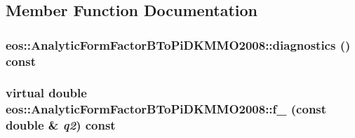 \subsection{Member Function Documentation}
\hypertarget{classeos_1_1AnalyticFormFactorBToPiDKMMO2008_a4996873565e4da45f132cbfdd90f7617}{
\subsubsection[{diagnostics}]{ eos::AnalyticFormFactorBToPiDKMMO2008::diagnostics () const}}
\label{classeos_1_1AnalyticFormFactorBToPiDKMMO2008_a4996873565e4da45f132cbfdd90f7617}
\hypertarget{classeos_1_1AnalyticFormFactorBToPiDKMMO2008_a646f3764614e79700d31571b9df620ba}{
\subsubsection[{f\_\-0}]{\setlength{\rightskip}{0pt plus 5cm}virtual double eos::AnalyticFormFactorBToPiDKMMO2008::f\_ (const double \& {\em q2}) const}}
\label{classeos_1_1AnalyticFormFactorBToPiDKMMO2008_a646f3764614e79700d31571b9df620ba}


